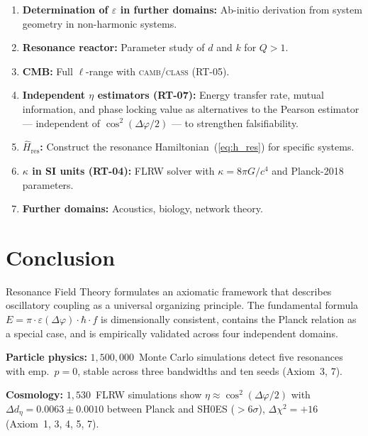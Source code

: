 \documentclass[12pt]{iopart}
\begin{document}
	
	\begin{enumerate}
		\item \textbf{Determination of $\varepsilon$ in further domains:}
		Ab-initio derivation from system geometry in non-harmonic systems.
		
		\item \textbf{Resonance reactor:}
		Parameter study of $d$ and $k$ for $Q > 1$.
		
		\item \textbf{CMB:}
		Full $\ell$-range with
		\textsc{camb}/\textsc{class} (RT-05).
		
		\item \textbf{Independent $\eta$ estimators (RT-07):}
		Energy transfer rate, mutual information, and phase locking value
		as alternatives to the Pearson estimator — independent of
		$\cos^2(\Delta\varphi/2)$ — to strengthen falsifiability.
		
		\item \textbf{$\hat{H}_{\mathrm{res}}$:}
		Construct the resonance Hamiltonian~(\ref{eq:h_res})
		for specific systems.
		
		\item \textbf{$\kappa$ in SI units (RT-04):}
		FLRW solver with $\kappa = 8\pi G/c^4$ and Planck-2018 parameters.
		
		\item \textbf{Further domains:}
		Acoustics, biology, network theory.
	\end{enumerate}
	
	
	\section{Conclusion}
	
	Resonance Field Theory formulates an axiomatic framework
	that describes oscillatory coupling as a universal
	organizing principle. The fundamental formula
	$E = \pi \cdot \varepsilon(\Delta\varphi) \cdot
	\hbar \cdot f$ is dimensionally consistent, contains
	the Planck relation as a special case, and is empirically
	validated across four independent domains.
	
	\textbf{Particle physics:}
	$1{,}500{,}000$~Monte Carlo simulations detect five
	resonances with emp.\ $p = 0$, stable across three
	bandwidths and ten seeds (Axiom~3, 7).
	
	\textbf{Cosmology:}
	$1{,}530$~FLRW simulations show
	$\eta \approx \cos^2(\Delta\varphi/2)$ with
	$\Delta d_\eta = 0.0063 \pm 0.0010$ between
	Planck and SH0ES ($>6\sigma$),
	$\Delta\chi^2 = +16$ (Axiom~1, 3, 4, 5, 7).
	
\end{document}
